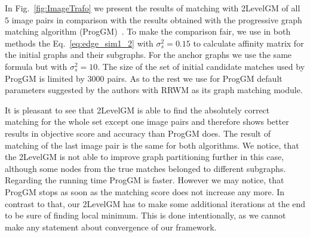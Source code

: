 In Fig.~\ref{fig:ImageTrafo} we present the results of matching with 2LevelGM of all $5$ image pairs in comparison with the results obtained with the progressive graph matching algorithm (ProgGM)~\cite{Cho2012_ProgressiveGM}. %
To make the comparison fair, we use in both methods the Eq.~\eqref{eq:edge_sim1_2} with $\sigma_s^2=0.15$ to calculate affinity matrix for the initial graphs and their subgraphs. For the anchor graphs we use the same formula but with $\sigma^2_s=10$. The size of the set of initial candidate matches used by ProgGM is limited by $3000$ pairs. As to the rest we use for ProgGM default parameters suggested by the authors with RRWM as its graph matching module.

It is pleasant to see that 2LevelGM is able to find the absolutely correct matching for the whole set except one image pairs and therefore shows better results in objective score and accuracy than ProgGM does. The result of matching of the last image pair is  the same for both algorithms. We notice, that the 2LevelGM is not able to improve graph partitioning further in this case, although some nodes from the true matches belonged to different subgraphs. Regarding the running time ProgGM is faster. However we  may notice, that ProgGM  stops as soon as the matching score does not increase any more. In contrast to that, our 2LevelGM has to make some additional iterations at the end to be sure of finding local minimum. This is done intentionally, as we cannot make  any statement about convergence of our framework.

